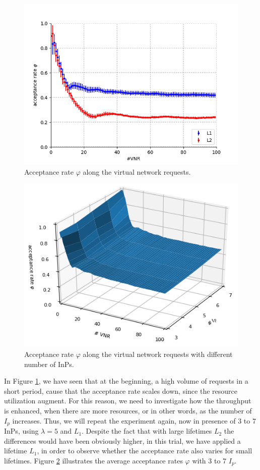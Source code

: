 \begin{figure}[bth]
	\centering
	\includegraphics[scale=0.7]{gfx/ev_acceptance_rate.png}    
  	\caption{Acceptance rate $\varphi$ along the virtual network requests.}
  	\label{fig:acceptance_rate}
\end{figure}

\begin{figure}[h!]
	\centering
	\includegraphics[scale=1]{gfx/ev_acceptance_rate3D.png}    
  	\caption{Acceptance rate $\varphi$ along the virtual network requests with different number of InPs.}
  	\label{fig:acceptance_rate_3D}
\end{figure}

In Figure \ref{fig:acceptance_rate}, we have seen that at the beginning, a high volume of requests in a short period, cause that the acceptance rate scales down, since the resource utilization augment. For this reason, we need to investigate how the throughput is enhanced, when there are more resources, or in other words, as the number of $I_p$ increases. Thus, we will repeat the experiment again, now in presence of 3 to 7 InPs, using $\lambda = 5$ and $L_1$. Despite the fact that with large lifetimes $L_2$ the differences would have been obviously higher, in this trial, we have applied a lifetime $L_1$, in order to observe whether the acceptance rate also varies for small lifetimes. Figure \ref{fig:acceptance_rate_3D} illustrates the average acceptance rates $\varphi$ with 3 to 7 $I_p$.

